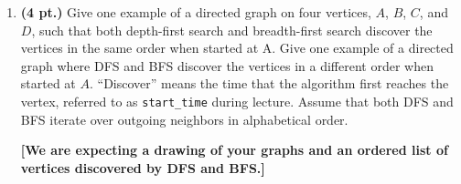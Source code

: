 \documentclass{article}
\begin{document}
\begin{enumerate}
\begin{multicols}{2}
\begin{enumerate}
        \item (1 point)


        \item (1 point)



      \end{enumerate}
    \end{multicols}

  \newpage

  \item \textbf{(4 pt.)} Give one example of a directed graph on four vertices,
    $A$, $B$, $C$, and $D$, such that both depth-first search and breadth-first
    search discover the vertices in the same order when started at A. Give one
    example of a directed graph where DFS and BFS discover the vertices in a
    different order when started at $A$. ``Discover'' means the time that the
    algorithm first reaches the vertex, referred to as \texttt{start\_time}
    during lecture. Assume that both DFS and BFS iterate over outgoing
    neighbors in alphabetical order.

    \textbf{[We are expecting a drawing of your graphs and an ordered list of
    vertices discovered by DFS and BFS.]}
\end{enumerate}
\end{document}
